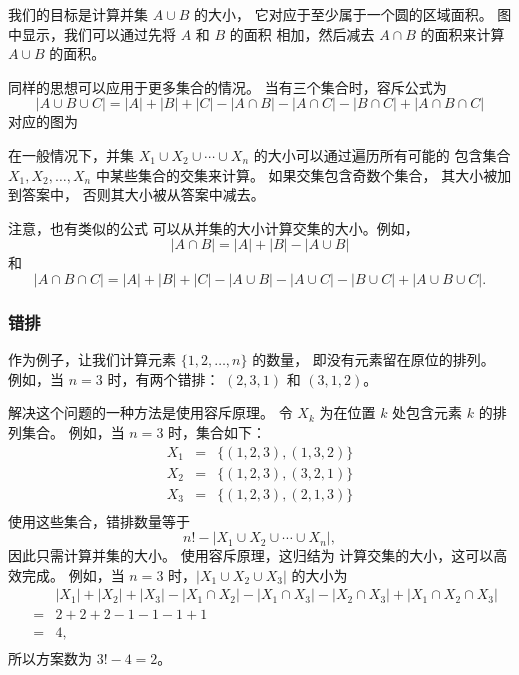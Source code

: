我们的目标是计算并集 $A \cup B$ 的大小，
它对应于至少属于一个圆的区域面积。
图中显示，我们可以通过先将 $A$ 和 $B$ 的面积
相加，然后减去 $A \cap B$ 的面积来计算 $A \cup B$ 的面积。

同样的思想可以应用于更多集合的情况。
当有三个集合时，容斥公式为
\[ |A \cup B \cup C| = |A| + |B| + |C| - |A \cap B|  - |A \cap C|  - |B \cap C| + |A \cap B \cap C| \]
对应的图为

\begin{center}
\end{center}

在一般情况下，并集
$X_1 \cup X_2 \cup \cdots \cup X_n$
的大小可以通过遍历所有可能的
包含集合 $X_1,X_2,\ldots,X_n$ 中某些集合的交集来计算。
如果交集包含奇数个集合，
其大小被加到答案中，
否则其大小被从答案中减去。

注意，也有类似的公式
可以从并集的大小计算交集的大小。例如，
\[ |A \cap B| = |A| + |B| - |A \cup B|\]
和
\[ |A \cap B \cap C| = |A| + |B| + |C| - |A \cup B|  - |A \cup C|  - |B \cup C| + |A \cup B \cup C| .\]

\subsubsection{错排}


作为例子，让我们计算元素 $\{1,2,\ldots,n\}$ 的数量，
即没有元素留在原位的排列。
例如，当 $n=3$ 时，有两个错排：
$(2,3,1)$ 和 $(3,1,2)$。

解决这个问题的一种方法是使用容斥原理。
令 $X_k$ 为在位置 $k$ 处包含元素 $k$ 的排列集合。
例如，当 $n=3$ 时，集合如下：
\[
\begin{array}{lcl}
X_1 & = & \{(1,2,3),(1,3,2)\} \\
X_2 & = & \{(1,2,3),(3,2,1)\} \\
X_3 & = & \{(1,2,3),(2,1,3)\} \\
\end{array}
\]
使用这些集合，错排数量等于
\[ n! - |X_1 \cup X_2 \cup \cdots \cup X_n|, \]
因此只需计算并集的大小。
使用容斥原理，这归结为
计算交集的大小，这可以高效完成。
例如，当 $n=3$ 时，$|X_1 \cup X_2 \cup X_3|$ 的大小为
\[
\begin{array}{lcl}
 & & |X_1| + |X_2| + |X_3| - |X_1 \cap X_2|  - |X_1 \cap X_3|  - |X_2 \cap X_3| + |X_1 \cap X_2 \cap X_3| \\
 & = & 2+2+2-1-1-1+1 \\
 & = & 4, \\
\end{array}
\]
所以方案数为 $3!-4=2$。

